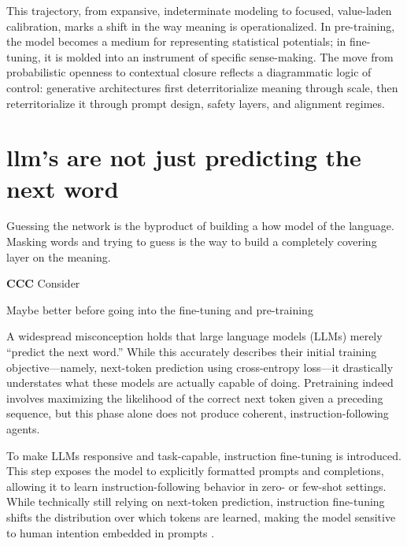 This trajectory, from expansive, indeterminate modeling to focused, value-laden calibration, marks a shift in the way meaning is operationalized. In pre-training, the model becomes a medium for representing statistical potentials; in fine-tuning, it is molded into an instrument of specific sense-making. The move from probabilistic openness to contextual closure reflects a diagrammatic logic of control: generative architectures first deterritorialize meaning through scale, then reterritorialize it through prompt design, safety layers, and alignment regimes.




\section{\gls{llm}'s are not just predicting the next word }

Guessing the network is the byproduct of building a how model of the language.
Masking words and trying to guess is the way to build a completely covering
layer on the meaning.

\begin{orangebox}
	\textbf{CCC} Consider

	Maybe better before going into the fine-tuning and pre-training
\end{orangebox}

A widespread misconception holds that large language models (LLMs) merely “predict the next word.” While this accurately describes their initial training objective—namely, next-token prediction using cross-entropy loss—it drastically understates what these models are actually capable of doing. Pretraining indeed involves maximizing the likelihood of the correct next token given a preceding sequence, but this phase alone does not produce coherent, instruction-following agents.

To make LLMs responsive and task-capable, instruction fine-tuning is introduced. This step exposes the model to explicitly formatted prompts and completions, allowing it to learn instruction-following behavior in zero- or few-shot settings. While technically still relying on next-token prediction, instruction fine-tuning shifts the distribution over which tokens are learned, making the model sensitive to human intention embedded in prompts \parencite{dalvi2025}.

